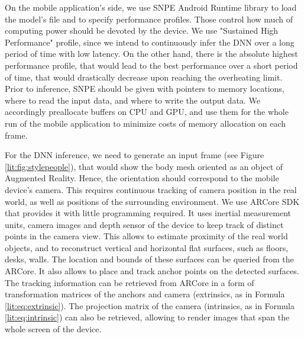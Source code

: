 On the mobile application's side, we use SNPE Android Runtime library to load the model's file and to specify performance profiles. Those control how much of computing power should be devoted by the device. We use "Sustained High Performance" profile, since we intend to continuously infer the DNN over a long period of time with low latency. On the other hand, there is the absolute highest performance profile, that would lead to the best performance over a short period of time, that would drastically decrease upon reaching the overheating limit. Prior to inference, SNPE should be given with pointers to memory locations, where to read the input data, and where to write the output data. We accordingly preallocate buffers on CPU and GPU, and use them for the whole run of the mobile application to minimize costs of memory allocation on each frame.

For the DNN inference, we need to generate an input frame (see Figure \ref{lit:fig:stylepeople}), that would show the body mesh oriented as an object of Augmented Reality. Hence, the orientation should correspond to the mobile device's camera. This requires continuous tracking of camera position in the real world, as well as positions of the surrounding environment. We use ARCore SDK \cite{aux:arcore22} that provides it with little programming required. It uses inertial measurement units, camera images and depth sensor of the device to keep track of distinct points in the camera view. This allows to estimate proximity of the real world objects, and to reconstruct vertical and horizontal flat surfaces, such as floors, desks, walls. The location and bounds of these surfaces can be queried from the ARCore. It also allows to place and track anchor points on the detected surfaces. The tracking information can be retrieved from ARCore in a form of transformation matrices of the anchors and camera (extrinsics, as in Formula \ref{lit:eq:extrinsic}). The projection matrix of the camera (intrinsics, as in Formula \ref{lit:eq:intrinsic}) can also be retrieved, allowing to render images that span the whole screen of the device. 

